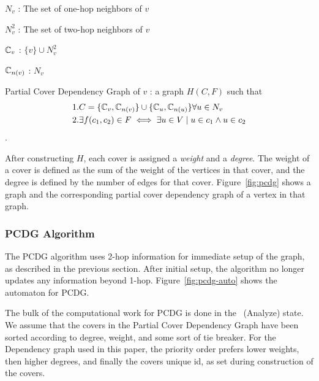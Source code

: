 \begin{defn}
$N_v$ : The set of one-hop neighbors of $v$
\end{defn}
\begin{defn}
$N_v^2$ : The set of two-hop neighbors of $v$ 
\end{defn}

\begin{defn}
${\mathbb C}_v$ : $\{v\} \cup N_v^2$
\end{defn}

\begin{defn}
${\mathbb C}_{n(v)}$ : $N_v$
\end{defn} 

\begin{defn}
Partial Cover Dependency Graph of $v$ : a graph $H(C,F)$ such that \begin{align*}& 1. C = \{{\mathbb C}_v, {\mathbb C}_{n(v)}\} \cup \{{\mathbb C}_u, {\mathbb C}_{n(u)}\} \forall u \in N_v\\ & 2. \exists f(c_1, c_2) \in F \iff \exists u \in V \mid u \in c_1 \land u \in c_2\end{align*}.
\end{defn} 

After constructing $H$, each cover is assigned a {\em weight} and a {\em degree}. The weight of a cover is defined as the sum of the weight of the vertices in that cover, and the degree is defined by the number of edges for that cover. Figure~\ref{fig:pcdg} shows a graph and the corresponding partial cover dependency graph of a vertex in that graph.



\subsubsection{PCDG Algorithm}
\label{sec:pcdg-alg}

The PCDG algorithm uses 2-hop information for immediate setup of the graph, as described in the previous section. After initial setup, the algorithm no longer updates any information beyond 1-hop. Figure~\ref{fig:pcdg-auto} shows the automaton for PCDG.



The bulk of the computational work for PCDG is done in the \cAd\ (Analyze) state. We assume that the covers in the Partial Cover Dependency Graph have been sorted according to degree, weight, and some sort of tie breaker. For the Dependency graph used in this paper, the priority order prefers lower weights, then higher degrees, and finally the covers unique id, as set during construction of the covers.


